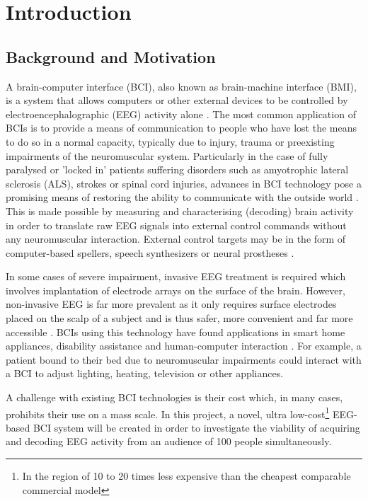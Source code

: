\chapter{Introduction}
\label{chapter:introduction}

\graphicspath{ {report/Chapter1/assets/} } 

\section{Background and Motivation}
\label{secetion:background-motivation}

A brain-computer interface (BCI), also known as brain-machine interface (BMI), is a system that allows computers or other external devices to be controlled by electroencephalographic (EEG) activity alone \cite{bci-survey-nicolas-alonso}. The most common application of BCIs is to provide a means of communication to people who have lost the means to do so in a normal capacity, typically due to injury, trauma or preexisting impairments of the neuromuscular system. Particularly in the case of fully paralysed or 'locked in' patients suffering disorders such as amyotrophic lateral sclerosis (ALS), strokes or spinal cord injuries, advances in BCI technology pose a promising means of restoring the ability to communicate with the outside world \cite{bci-wolpaw}. This is made possible by measuring and characterising (decoding) brain activity in order to translate raw EEG signals into external control commands without any neuromuscular interaction. External control targets may be in the form of computer-based spellers, speech synthesizers or neural prostheses \cite{bci-survey-nicolas-alonso}. 

In some cases of severe impairment, invasive EEG treatment is required which involves implantation of electrode arrays on the surface of the brain. However, non-invasive EEG is far more prevalent as it only requires surface electrodes placed on the scalp of a subject and is thus safer, more convenient and far more accessible \cite{duart-comparing-ssvep-stimuli}. BCIs using this technology have found applications in smart home appliances, disability assistance and human-computer interaction \cite{zhao-stimulus-layout-effect}. For example, a patient bound to their bed due to neuromuscular impairments could interact with a BCI to adjust lighting, heating, television or other appliances. 

A challenge with existing BCI technologies is their cost which, in many cases, prohibits their use on a mass scale. In this project, a novel, ultra low-cost\footnote{In the region of 10 to 20 times less expensive than the cheapest comparable commercial model} EEG-based BCI system will be created in order to investigate the viability of acquiring and decoding EEG activity from an audience of 100 people simultaneously. 

